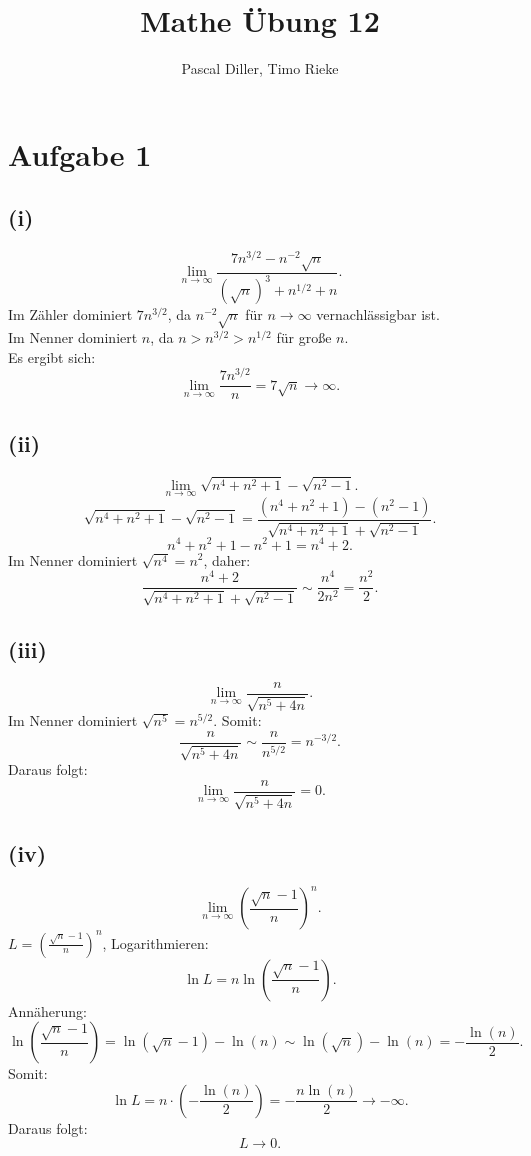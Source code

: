 \documentclass{article}
\title{Mathe Übung 12}
\author{Pascal Diller, Timo Rieke}
\begin{document}
\maketitle

\section*{Aufgabe 1}

\subsection*{(i)}
\[\lim_{n \to \infty} \frac{7n^{3/2} - n^{-2} \sqrt{n}}{(\sqrt{n})^3 + n^{1/2} + n}.\]
Im Zähler dominiert \(7n^{3/2}\), da \(n^{-2} \sqrt{n}\) für \(n \to \infty\) vernachlässigbar ist. \\
Im Nenner dominiert \(n\), da \(n > n^{3/2} > n^{1/2}\) für große \(n\). \\
Es ergibt sich:
\[\lim_{n \to \infty} \frac{7n^{3/2}}{n} = 7\sqrt{n} \to \infty.\]

\subsection*{(ii)}
\[\lim_{n \to \infty} \sqrt{n^4 + n^2 + 1} - \sqrt{n^2 - 1}.\]
\[\sqrt{n^4 + n^2 + 1} - \sqrt{n^2 - 1} = \frac{(n^4 + n^2 + 1) - (n^2 - 1)}{\sqrt{n^4 + n^2 + 1} + \sqrt{n^2 - 1}}.\]
\[n^4 + n^2 + 1 - n^2 + 1 = n^4 + 2.\]
Im Nenner dominiert \(\sqrt{n^4} = n^2\), daher:
\[\frac{n^4 + 2}{\sqrt{n^4 + n^2 + 1} + \sqrt{n^2 - 1}} \sim \frac{n^4}{2n^2} =\frac{n^2}{2}.\]

\subsection*{(iii)} 
\[\lim_{n \to \infty} \frac{n}{\sqrt{n^5 + 4n}}.\]
Im Nenner dominiert \(\sqrt{n^5} = n^{5/2}\). Somit:
\[\frac{n}{\sqrt{n^5 + 4n}} \sim \frac{n}{n^{5/2}} = n^{-3/2}.\]
Daraus folgt:
\[\lim_{n \to \infty} \frac{n}{\sqrt{n^5 + 4n}} = 0.\]

\subsection*{(iv)} 
\[\lim_{n \to \infty} \left(\frac{\sqrt{n} - 1}{n}\right)^n.\]
\(L = \left(\frac{\sqrt{n} - 1}{n}\right)^n\), Logarithmieren:
\[\ln L = n \ln\left(\frac{\sqrt{n} - 1}{n}\right).\]
Annäherung:
\[\ln\left(\frac{\sqrt{n} - 1}{n}\right) = \ln(\sqrt{n} - 1) - \ln(n) \sim \ln(\sqrt{n}) - \ln(n) = -\frac{\ln(n)}{2}.\]
Somit:
\[\ln L = n \cdot \left(-\frac{\ln(n)}{2}\right) = -\frac{n \ln(n)}{2} \to -\infty.\]
Daraus folgt:
\[L \to 0.\]
\end{document}

